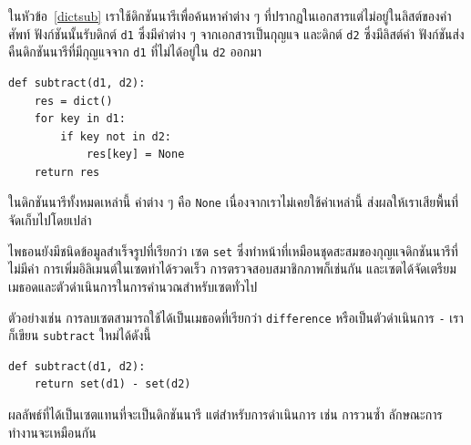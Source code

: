 ในหัวข้อ~\ref{dictsub} เราใช้ดิกชันนารีเพื่อค้นหาคำต่าง ๆ ที่ปรากฏในเอกสารแต่ไม่อยู่ในลิสต์ของคำศัพท์ ฟังก์ชันนั้นรับดิกต์ {\tt d1} 
ซึ่งมีคำต่าง ๆ จากเอกสารเป็นกุญแจ และดิกต์ {\tt d2} ซึ่งมีลิสต์คำ 
ฟังก์ชันส่งคืนดิกชันนารีที่มีกุญแจจาก {\tt d1} ที่ไม่ได้อยู่ใน {\tt d2} ออกมา


\begin{verbatim}
def subtract(d1, d2):
    res = dict()
    for key in d1:
        if key not in d2:
            res[key] = None
    return res
\end{verbatim}
%
ในดิกชันนารีทั้งหมดเหล่านี้ ค่าต่าง ๆ คือ {\tt None} เนื่องจากเราไม่เคยใช้ค่าเหล่านี้ ส่งผลให้เราเสียพื้นที่จัดเก็บไปโดยเปล่า

ไพธอนยังมีชนิดข้อมูลสำเร็จรูปที่เรียกว่า เซต {\tt set} ซึ่งทำหน้าที่เหมือนชุดสะสมของกุญแจดิกชันนารีที่ไม่มีค่า 
การเพิ่มอิลิเมนต์ในเซตทำได้รวดเร็ว การตรวจสอบสมาชิกภาพก็เช่นกัน และเซตได้จัดเตรียมเมธอดและตัวดำเนินการในการคำนวณสำหรับเซตทั่วไป

ตัวอย่างเช่น การลบเซตสามารถใช้ได้เป็นเมธอดที่เรียกว่า {\tt difference} หรือเป็นตัวดำเนินการ {\tt -} เราก็เขียน {\tt subtract} ใหม่ได้ดังนี้

\begin{verbatim}
def subtract(d1, d2):
    return set(d1) - set(d2)
\end{verbatim}
%
ผลลัพธ์ที่ได้เป็นเซตแทนที่จะเป็นดิกชันนารี แต่สำหรับการดำเนินการ 
เช่น การวนซ้ำ ลักษณะการทำงานจะเหมือนกัน

